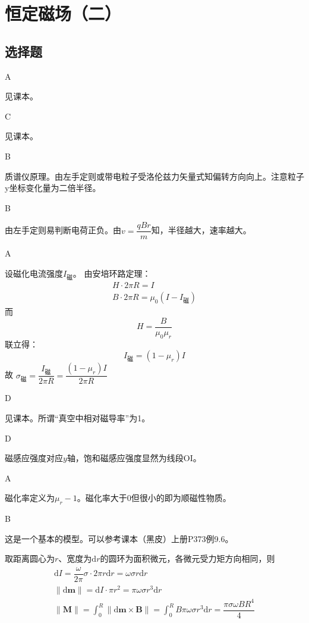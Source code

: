 \documentclass[b5paper,opensource,sourcefont,parskip]{qyxf-book}
\newcommand{\di}[1]{\mathrm{d}#1}
\begin{document}
\chapter{恒定磁场（二）}%
\section{选择题}

A

\solve 
见课本。

C

\solve 
见课本。

B

\solve
质谱仪原理。由左手定则或带电粒子受洛伦兹力矢量式知偏转方向向上。注意粒子y坐标变化量为二倍半径。

B

\solve
由左手定则易判断电荷正负。由$v=\dfrac{qBr}{m}$知，半径越大，速率越大。

A

\solve
设磁化电流强度$I_\text{磁}$。
由安培环路定理：
\begin{gather*}
	H\cdot 2\pi R=I\\
	B\cdot 2\pi R=\mu_0(I-I_\text{磁})
\end{gather*}
而
\[
H=\dfrac{B}{\mu_0\mu_r}
\]
联立得：
\[
I_\text{磁}=(1-\mu_r)I
\]
故
$\sigma_\text{磁}=\dfrac{I_\text{磁}}{2\pi R}=\dfrac{(1-\mu_r)I}{2\pi R}$
\footnotemark[1]

D

\solve
见课本。所谓“真空中相对磁导率”为1。

D

\solve
磁感应强度对应$y$轴，饱和磁感应强度显然为线段OI。

A

\solve
磁化率定义为$\mu_r-1$。磁化率大于$0$但很小的即为顺磁性物质。

B

\solve
这是一个基本的模型。可以参考课本（黑皮）上册\rm{P}373例9.6。

取距离圆心为$r$、宽度为$\di{r}$的圆环为面积微元，各微元受力矩方向相同，则
\begin{gather*}
	\di{I}=\dfrac{\omega}{2\pi}\sigma\cdot 2\pi r\di{r}=\omega\sigma r\di{r}\\
	\|\di{\textbf{m}}\|=\di{I}\cdot \pi r^2=\pi\omega\sigma r^3\di{r}\\
	\|\textbf{M}\|=\int_{0}^{R}\|\di{\textbf{m}}\times \textbf{B}\|=\int_{0}^{R}B\pi\omega\sigma r^3\di{r}=\dfrac{\pi\sigma\omega BR^4}{4}
\end{gather*}
\end{document}
